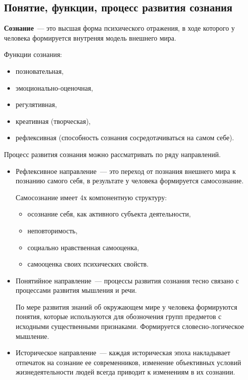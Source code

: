 \subsection{Понятие, функции, процесс развития сознания}
\textbf{Сознание}~--- это высшая форма психического отражения, в ходе которого у человека формируется внутреняя модель внешнего мира.

Функции сознания:
\begin{itemize}
	\item позновательная,
	\item эмоционально-оценочная,
	\item регулятивная,
	\item креативная (творческая),
	\item рефлексивная (способность сознания сосредотачиваться на самом себе).
\end{itemize}

Процесс развития сознания можно рассматривать по ряду направлений.
\begin{itemize}
	\item Рефлексивное направление~--- это переход от познания внешнего мира к познанию самого себя, в результате у человека формируется самосознание.
	
	Самосознание имеет 4х компонентную структуру:
		\begin{itemize}
			\item осознание себя, как активного субъекта деятельности,
			\item неповторимость,
			\item социально нравственная самооценка,
			\item самооценка своих психических свойств.
		\end{itemize}
	\item Понятийное направление~--- процессы развития сознания тесно связано с процессами развития мышления и речи.
	
	По мере развития знаний об окружающем мире у человека формируются понятия, которые используются для обозночения групп предметов с исходными существенными признаками. Формируется словесно-логическое мышление.
	\item Историческое направление~--- каждая историческая эпоха накладывает отпечаток на сознание ее современников, изменение объективных условий жизнедеятельности людей всегда приводит к изменениям в их сознании.
\end{itemize}


